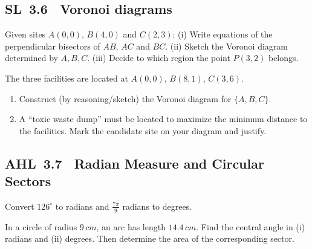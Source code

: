 \documentclass[11pt]{article}
\def\mathrm#1{#1}%
\newcommand{\tocsubsection}[1]{\subsection{#1}}
\newcounter{question}
\begin{document}
\tocsubsection{SL 3.6 \; Voronoi diagrams}

\begin{question}
Given sites $A(0,0)$, $B(4,0)$ and $C(2,3)$:
(i) Write equations of the perpendicular bisectors of $\overline{AB}$, $\overline{AC}$ and $\overline{BC}$.
(ii) Sketch the Voronoi diagram determined by $A,B,C$.
(iii) Decide to which region the point $P(3,2)$ belongs.
\end{question}


\begin{question}
 The three facilities are located at $A(0,0)$, $B(8,1)$, $C(3,6)$. 
\begin{enumerate}
  \item Construct (by reasoning/sketch) the Voronoi diagram for $\{A,B,C\}$.
  \item A “toxic waste dump” must be located to maximize the minimum distance to the facilities. Mark the candidate site on your diagram and justify.
\end{enumerate}
\begin{center}
\end{center}
\end{question}


\tocsubsection{AHL 3.7 \; Radian Measure and Circular Sectors}

\begin{question}
Convert $126^{\circ}$ to radians and $\tfrac{7\pi}{9}$ radians to degrees.
\end{question}

\begin{question}
In a circle of radius $9\,\mathrm{cm}$, an arc has length $14.4\,\mathrm{cm}$.
Find the central angle in (i) radians and (ii) degrees.  Then determine the
area of the corresponding sector.
\end{question}
\end{document}
